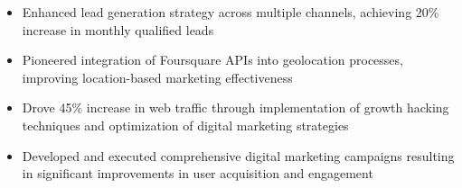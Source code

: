 \documentclass[10pt,a4paper,ragged2e,withhyper]{altacv}
\begin{document}
\begin{paracol}{2}
\begin{itemize}
\item Enhanced lead generation strategy across multiple channels, achieving 20\% increase in monthly qualified leads
\item Pioneered integration of Foursquare APIs into geolocation processes, improving location-based marketing effectiveness
\item Drove 45\% increase in web traffic through implementation of growth hacking techniques and optimization of digital marketing strategies
\item Developed and executed comprehensive digital marketing campaigns resulting in significant improvements in user acquisition and engagement
\end{itemize}




\switchcolumn



\end{paracol}
\end{document}
